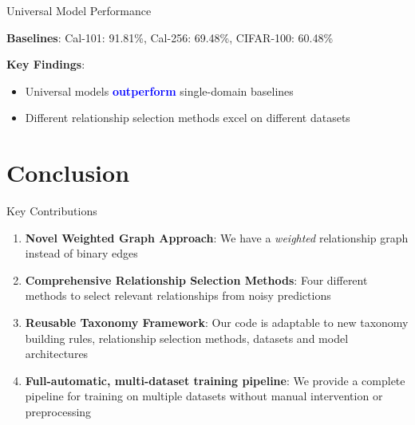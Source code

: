 \documentclass[aspectratio=169]{beamer}
\begin{document}
\begin{frame}{Universal Model Performance}
    \vspace{0.5em}

    \textbf{Baselines}: Cal-101: 91.81\%, Cal-256: 69.48\%, CIFAR-100: 60.48\%

    \textbf{Key Findings}:
    \begin{itemize}
        \item Universal models \textcolor{blue}{\textbf{outperform}} single-domain baselines
        \item Different relationship selection methods excel on different datasets
    \end{itemize}
\end{frame}

\section{Conclusion}

\begin{frame}{Key Contributions}
    \begin{enumerate}
        \item \textbf{Novel Weighted Graph Approach}: We have a \textit{weighted} relationship graph instead of binary edges

        \item \textbf{Comprehensive Relationship Selection Methods}: Four different methods to select relevant relationships from noisy predictions

        \item \textbf{Reusable Taxonomy Framework}: Our code is adaptable to new taxonomy building rules,
              relationship selection methods, datasets and model architectures

        \item \textbf{Full-automatic, multi-dataset training pipeline}: We provide a complete pipeline for training on multiple datasets without manual intervention or preprocessing
    \end{enumerate}
\end{frame}
\end{document}
